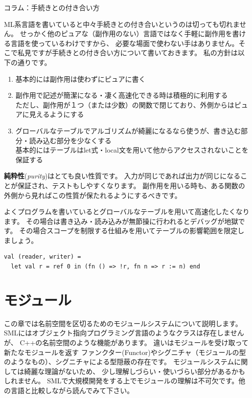 \documentclass[11pt,a4paper]{jarticle}
\begin{document}
\begin{itembox}[l]{コラム：手続きとの付き合い方}

ML系言語を書いていると中々手続きとの付き合いというのは切っても切れません。
せっかく他のピュアな（副作用のない）言語ではなく手軽に副作用を書ける言語を使っているわけですから、
必要な場面で使わない手はありません。そこで私見ですが手続きとの付き合い方について書いておきます。
私の方針は以下の通りです。

\begin{enumerate}
\item 基本的には副作用は使わずにピュアに書く
\item 副作用で記述が簡潔になる・凄く高速化できる時は積極的に利用する\\
  ただし、副作用が１つ（または少数）の関数で閉じており、外側からはピュアに見えるようにする
\item グローバルなテーブルでアルゴリズムが綺麗になるなら使うが、書き込む部分・読み込む部分を少なくする\\
  基本的にはテーブルはlet式・local文を用いて他からアクセスされないことを保証する
\end{enumerate}

\textbf{純粋性}(\textit{purity})はとても良い性質です。
入力が同じであれば出力が同じになることが保証され、テストもしやすくなります。
副作用を用いる時も、ある関数の外側から見ればこの性質が保たれるようにするべきです。

よくプログラムを書いているとグローバルなテーブルを用いて高速化したくなります。
その場合は書き込み・読み込みが無節操に行われるとデバッグが地獄です。
その場合スコープを制限する仕組みを用いてテーブルの影響範囲を限定しましょう。

\begin{lstlisting}[caption=let式でリファレンスが他からアクセスされないことを保証する]
val (reader, writer) =
  let val r = ref 0 in (fn () => !r, fn n => r := n) end
\end{lstlisting}

\end{itembox}

\section{モジュール}

この章では名前空間を区切るためのモジュールシステムについて説明します。
SMLにはオブジェクト指向プログラミング言語のようなクラスは存在しませんが、
C++の名前空間のような機能があります。
違いはモジュールを受け取って新たなモジュールを返す
ファンクター(Functor)やシグニチャ（モジュールの型のようなもの）、シグニチャによる型隠蔽の存在です。
モジュールシステムに関しては綺麗な理論がないため、
少し理解しづらい・使いづらい部分があるかもしれません。
SMLで大規模開発をする上でモジュールの理解は不可欠です。他の言語と比較しながら読んでみて下さい。
\end{document}
